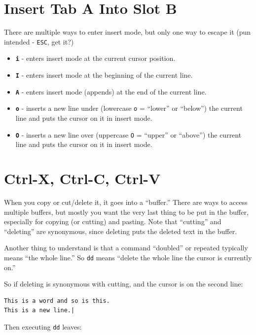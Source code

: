 \documentclass[10pt,]{book}
\numberwithin{figure}{chapter}
\begin{document}
\section{Insert Tab A Into Slot B}\label{insert-tab-a-into-slot-b}

There are multiple ways to enter insert mode, but only one way to escape
it (pun intended - \texttt{ESC}, get it?)

\begin{itemize}
\item
  \textbf{\texttt{i}} - enters insert mode at the current cursor
  position.
\item
  \textbf{\texttt{I}} - enters insert mode at the beginning of the
  current line.
\item
  \textbf{\texttt{A}} - enters insert mode (appends) at the end of the
  current line.
\item
  \textbf{\texttt{o}} - inserts a new line under (lowercase \texttt{o} =
  ``lower'' or ``below'') the current line and puts the cursor on it in
  insert mode.
\item
  \textbf{\texttt{O}} - inserts a new line over (uppercase \texttt{O} =
  ``upper'' or ``above'') the current line and puts the cursor on it in
  insert mode.
\end{itemize}

\section{Ctrl-X, Ctrl-C, Ctrl-V}\label{ctrl-x-ctrl-c-ctrl-v}

When you copy or cut/delete it, it goes into a ``buffer.'' There are
ways to access multiple buffers, but mostly you want the very last thing
to be put in the buffer, especially for copying (or cutting) and
pasting. Note that ``cutting'' and ``deleting'' are synonymous, since
deleting puts the deleted text in the buffer.

Another thing to understand is that a command ``doubled'' or repeated
typically means ``the whole line.'' So \texttt{dd} means ``delete the
whole line the cursor is currently on.''

So if deleting is synonymous with cutting, and the cursor is on the
second line:

\begin{verbatim}
This is a word and so is this.
This is a new line.|
\end{verbatim}

Then executing \texttt{dd} leaves:
\end{document}
